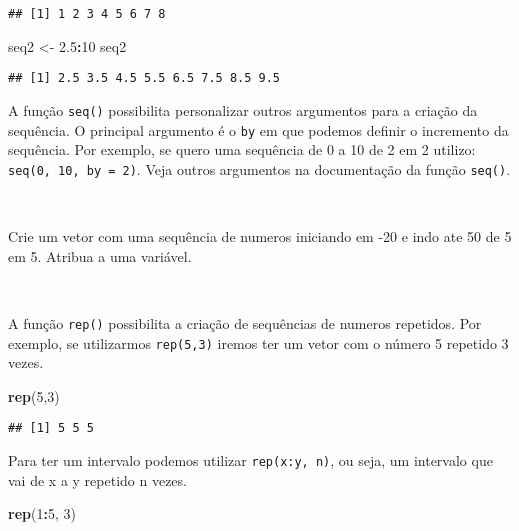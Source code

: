 \documentclass[]{book}
\newenvironment{Shaded}{\begin{snugshade}}{\end{snugshade}}
\newcommand{\DecValTok}[1]{\textcolor[rgb]{0.00,0.00,0.81}{#1}}
\newcommand{\FloatTok}[1]{\textcolor[rgb]{0.00,0.00,0.81}{#1}}
\newcommand{\KeywordTok}[1]{\textcolor[rgb]{0.13,0.29,0.53}{\textbf{#1}}}
\newcommand{\NormalTok}[1]{#1}
\newcommand{\OperatorTok}[1]{\textcolor[rgb]{0.81,0.36,0.00}{\textbf{#1}}}
\newcommand{\StringTok}[1]{\textcolor[rgb]{0.31,0.60,0.02}{#1}}
\theoremstyle{definition}
\theoremstyle{definition}
\theoremstyle{definition}
\theoremstyle{remark}
\let\BeginKnitrBlock\begin \let\EndKnitrBlock\end
\begin{document}
\begin{verbatim}
## [1] 1 2 3 4 5 6 7 8
\end{verbatim}

\begin{Shaded}
\begin{Highlighting}[]
\NormalTok{seq2 <-}\StringTok{ }\FloatTok{2.5}\OperatorTok{:}\DecValTok{10}
\NormalTok{seq2}
\end{Highlighting}
\end{Shaded}

\begin{verbatim}
## [1] 2.5 3.5 4.5 5.5 6.5 7.5 8.5 9.5
\end{verbatim}

A função \texttt{seq()} possibilita personalizar outros argumentos para a criação da sequência. O principal argumento é o \texttt{by} em que podemos definir o incremento da sequência. Por exemplo, se quero uma sequência de 0 a 10 de 2 em 2 utilizo: \texttt{seq(0,\ 10,\ by\ =\ 2)}. Veja outros argumentos na documentação da função \texttt{seq()}.

~

\BeginKnitrBlock{exercise}
\protect\hypertarget{exr:unnamed-chunk-43}{}{\label{exr:unnamed-chunk-43} }Crie um vetor com uma sequência de numeros iniciando em -20 e indo ate 50 de 5 em 5. Atribua a uma variável.
\EndKnitrBlock{exercise}

~

A função \texttt{rep()} possibilita a criação de sequências de numeros repetidos. Por exemplo, se utilizarmos \texttt{rep(5,3)} iremos ter um vetor com o número 5 repetido 3 vezes.

\begin{Shaded}
\begin{Highlighting}[]
\KeywordTok{rep}\NormalTok{(}\DecValTok{5}\NormalTok{,}\DecValTok{3}\NormalTok{)}
\end{Highlighting}
\end{Shaded}

\begin{verbatim}
## [1] 5 5 5
\end{verbatim}

Para ter um intervalo podemos utilizar \texttt{rep(x:y,\ n)}, ou seja, um intervalo que vai de x a y repetido n vezes.

\begin{Shaded}
\begin{Highlighting}[]
\KeywordTok{rep}\NormalTok{(}\DecValTok{1}\OperatorTok{:}\DecValTok{5}\NormalTok{, }\DecValTok{3}\NormalTok{)}
\end{Highlighting}
\end{Shaded}
\end{document}
